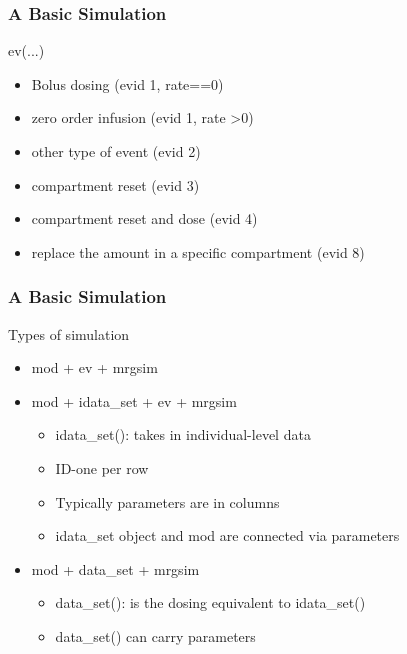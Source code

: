 \documentclass[
	11pt, %
]{beamer}
\begin{document}

\begin{frame}[fragile]{}
	\frametitle{A Basic Simulation}
	\begin{block}{ev(...)}
\small
     \begin{itemize}
     \item Bolus dosing (evid 1, rate==0)
     \item zero order infusion (evid 1, rate \textgreater 0)
     \item other type of event (evid 2)
     \item compartment reset (evid 3)
     \item compartment reset and dose (evid 4)
     \item replace the amount in a specific compartment (evid 8)
     \end{itemize}
    \end{block}
    
\end{frame}

\begin{frame}{}
	\frametitle{A Basic Simulation}
	\begin{block}{Types of simulation}
\small
     \begin{itemize}
     \item mod + ev + mrgsim
     \item mod + idata\_set + ev + mrgsim
       \begin{itemize}
         \item \textcolor{codepurple}{idata\_set()}: takes in individual-level data
         \item ID-one per row
         \item Typically parameters are in columns
         \item \textcolor{codepurple}{idata\_set} object and \textcolor{codepurple}{mod} are connected via parameters
       \end{itemize}
     \item mod + data\_set + mrgsim
          \begin{itemize}
          \item \textcolor{codepurple}{data\_set()}: is the dosing equivalent to \textcolor{codepurple}{idata\_set()}
          \item \textcolor{codepurple}{data\_set()} can carry parameters
          \end{itemize}
     \end{itemize}
    \end{block}
 \end{frame}


\end{document}
